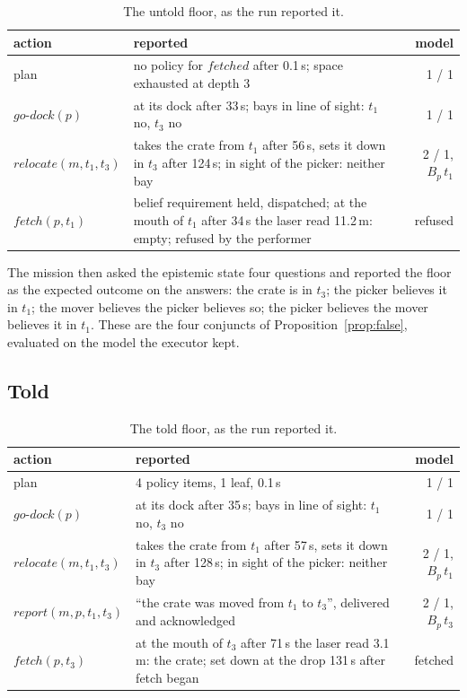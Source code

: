 \documentclass[11pt,a4paper]{article}
\theoremstyle{definition}
\newcommand{\Bop}[1]{B_{#1}}
\newcommand{\ag}[1]{\mathit{#1}}
\newcommand{\pk}{\ag{p}}
\newcommand{\mv}{\ag{m}}
\begin{document}
\begin{table}[H]
\centering\small
\caption{The untold floor, as the run reported it.}
\label{tab:untold-run}
\begin{tabularx}{\textwidth}{@{}l X r@{}}
\toprule
action & reported & model \\
\midrule
plan & no policy for $\mathit{fetched}$ after 0.1\,s; space exhausted at depth 3 & 1 / 1 \\
$\mathit{go\text{-}dock}(\pk)$ & at its dock after 33\,s; bays in line of sight: $t_1$ no, $t_3$ no & 1 / 1 \\
$\mathit{relocate}(\mv, t_1, t_3)$ & takes the crate from $t_1$ after 56\,s, sets it down in $t_3$ after 124\,s; in sight of the picker: neither bay & 2 / 1, $\Bop{\pk}\,t_1$ \\
$\mathit{fetch}(\pk, t_1)$ & belief requirement held, dispatched; at the mouth of $t_1$ after 34\,s the laser read 11.2\,m: empty; refused by the performer & refused \\
\bottomrule
\end{tabularx}
\end{table}

\noindent
The mission then asked the epistemic state four questions and reported the
floor as the expected outcome on the answers: the crate is in $t_3$; the picker
believes it in $t_1$; the mover believes the picker believes so; the picker
believes the mover believes it in $t_1$. These are the four conjuncts of
Proposition~\ref{prop:false}, evaluated on the model the executor kept.

\subsection{Told}

\begin{table}[H]
\centering\small
\caption{The told floor, as the run reported it.}
\label{tab:told-run}
\begin{tabularx}{\textwidth}{@{}l X r@{}}
\toprule
action & reported & model \\
\midrule
plan & 4 policy items, 1 leaf, 0.1\,s & 1 / 1 \\
$\mathit{go\text{-}dock}(\pk)$ & at its dock after 35\,s; bays in line of sight: $t_1$ no, $t_3$ no & 1 / 1 \\
$\mathit{relocate}(\mv, t_1, t_3)$ & takes the crate from $t_1$ after 57\,s, sets it down in $t_3$ after 128\,s; in sight of the picker: neither bay & 2 / 1, $\Bop{\pk}\,t_1$ \\
$\mathit{report}(\mv, \pk, t_1, t_3)$ & ``the crate was moved from $t_1$ to $t_3$'', delivered and acknowledged & 2 / 1, $\Bop{\pk}\,t_3$ \\
$\mathit{fetch}(\pk, t_3)$ & at the mouth of $t_3$ after 71\,s the laser read 3.1\,m: the crate; set down at the drop 131\,s after fetch began & fetched \\
\bottomrule
\end{tabularx}
\end{table}
\end{document}
